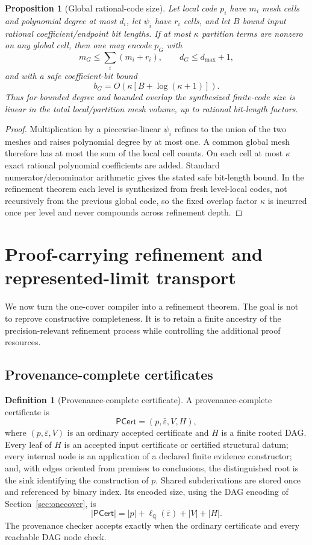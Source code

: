 \documentclass[11pt]{article}
\newtheorem{proposition}[theorem]{Proposition}
\theoremstyle{definition}
\newtheorem{definition}[theorem]{Definition}
\newcommand{\Q}{\mathbb{Q}}
\newcommand{\PCert}{\mathsf{PCert}}
\begin{document}
\begin{proposition}[Global rational-code size]\label{prop:codesize}
Let local code $p_i$ have $m_i$ mesh cells and polynomial degree at most $d_i$, let
$\psi_i$ have $r_i$ cells, and let $B$ bound input rational coefficient/endpoint bit
lengths.  If at most $\kappa$ partition terms are nonzero on any global cell, then one may
encode $p_G$ with
\[
 m_G\le\sum_i(m_i+r_i),
 \qquad
 d_G\le d_{\max}+1,
\]
and with a safe coefficient-bit bound
\[
 b_G=O\!\left(\kappa[B+\log(\kappa+1)]\right).
\]
Thus for bounded degree and bounded overlap the synthesized finite-code size is linear in
the total local/partition mesh volume, up to rational bit-length factors.
\end{proposition}

\begin{proof}
Multiplication by a piecewise-linear $\psi_i$ refines to the union of the two meshes and
raises polynomial degree by at most one.  A common global mesh therefore has at most the
sum of the local cell counts.  On each cell at most $\kappa$ exact rational polynomial
coefficients are added.  Standard numerator/denominator arithmetic gives the stated safe bit-length bound.  In the
refinement theorem each level is synthesized from fresh level-local codes, not recursively
from the previous global code, so the fixed overlap factor $\kappa$ is incurred once per
level and never compounds across refinement depth.
\end{proof}

\section{Proof-carrying refinement and represented-limit transport}\label{sec:descent}

We now turn the one-cover compiler into a refinement theorem.  The goal is not to reprove
constructive completeness.  It is to retain a finite ancestry of the precision-relevant
refinement process while controlling the additional proof resources.

\subsection{Provenance-complete certificates}

\begin{definition}[Provenance-complete certificate]\label{def:pcert}
A provenance-complete certificate is
\[
 \PCert=(p,\bar\varepsilon,V,H),
\]
where $(p,\bar\varepsilon,V)$ is an ordinary accepted certificate and $H$ is a finite
rooted DAG.  Every leaf of $H$ is an accepted input certificate or certified structural
datum; every internal node is an application of a declared finite evidence constructor;
and, with edges oriented from premises to conclusions, the distinguished root is the sink identifying the construction of $p$.  Shared subderivations are
stored once and referenced by binary index.  Its encoded size, using the DAG encoding of Section~\ref{sec:onecover}, is
\[
 |\PCert|=|p|+\ell_{\Q}(\bar\varepsilon)+|V|+|H|.
\]
The provenance checker accepts exactly when the ordinary certificate and every reachable
DAG node check.
\end{definition}
\end{document}
